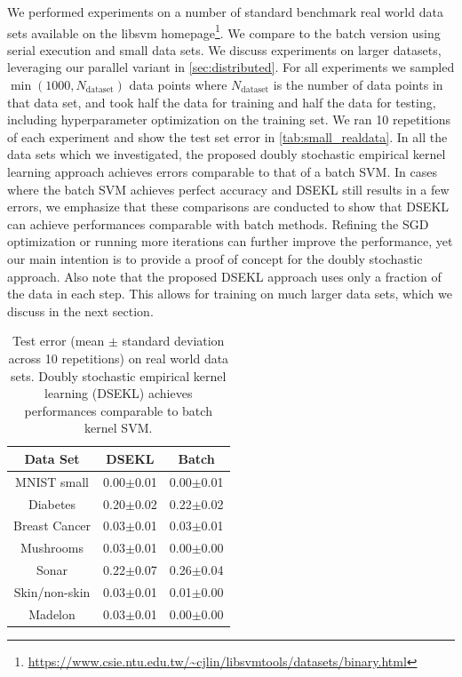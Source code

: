 \documentclass{article} %
\begin{document}
%

We performed experiments on a number of standard benchmark real world data sets available on the libsvm homepage\footnote{\url{https://www.csie.ntu.edu.tw/~cjlin/libsvmtools/datasets/binary.html}}. We compare to the batch version using serial execution and small data sets. We discuss experiments on larger datasets, leveraging our parallel variant in \autoref{sec:distributed}. For all experiments we sampled $\min(1000,N_{\text{dataset}})$ data points where $N_{\text{dataset}}$ is the number of data points in that data set, and took half the data for training and half the data for testing, including hyperparameter optimization on the training set. We ran 10 repetitions of each experiment and show the test set error in \autoref{tab:small_realdata}. In all the data sets which we investigated, the proposed doubly stochastic empirical kernel learning approach achieves errors comparable to that of a batch SVM. In cases where the batch SVM achieves perfect accuracy and DSEKL still results in a few errors, we emphasize that these comparisons are conducted to show that DSEKL can achieve performances comparable with batch methods. Refining the SGD optimization or running more iterations can further improve the performance, yet our main intention is to provide a proof of concept for the doubly stochastic approach. Also note that the proposed DSEKL approach uses only a fraction of the data in each step. This allows for training on much larger data sets, which we discuss in the next section.
%
\begin{table}
\begin{center}
\begin{tabular}{ ccc } 
Data Set & DSEKL & Batch\\
 \hline
MNIST small & 0.00$\pm$0.01  & 0.00$\pm$0.01\\
Diabetes & 0.20$\pm$0.02  & 0.22$\pm$0.02\\
Breast Cancer &  0.03$\pm$0.01 & 0.03$\pm$0.01\\
Mushrooms & 0.03$\pm$0.01 & 0.00$\pm$0.00\\
Sonar & 0.22$\pm$0.07 & 0.26$\pm$0.04\\
Skin/non-skin & 0.03$\pm$0.01 &  0.01$\pm$0.00\\
Madelon & 0.03$\pm$0.01 &  0.00$\pm$0.00\\
 \hline
\end{tabular}
\caption{Test error (mean $\pm$ standard deviation across 10 repetitions) on real world data sets. Doubly stochastic empirical kernel learning (DSEKL) achieves performances comparable to batch kernel SVM. \label{tab:small_realdata}}
\end{center}
\end{table}
%
\end{document}
